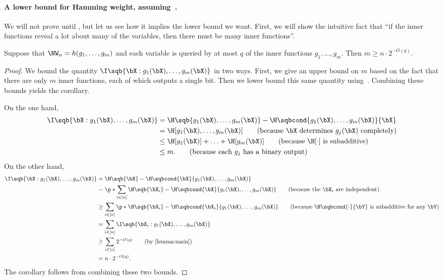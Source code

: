 \paragraph*{A lower bound for Hamming weight, assuming~.}
We will not prove  until , but let us see how it implies the lower bound we want.
First, we will show the intuitive fact that ``if the inner functions reveal a lot about many of the variables, then there must be many inner functions''.
\begin{corollary}
\label{corollary}
Suppose that $\HW_n = h(g_1, \ldots, g_m)$ and each variable is queried by at most $q$ of the inner functions $g_1, \ldots, g_m$.
Then $m \geq n \cdot 2^{-O(q)}$.
\end{corollary}
\begin{proof}
We bound the quantity $\I\sqb{\bX:g_1(\bX), \ldots, g_m(\bX)}$ in two ways.
First, we give an upper bound on $m$ based on the fact that there are only $m$ inner functions, each of which outputs a single bit.
Then we lower bound this same quantity using~.
Combining these bounds yields the corollary.

On the one hand,
\begin{align*}
\I\sqb{\bX:g_1(\bX), \ldots, g_m(\bX)}
&= \H\sqb{g_1(\bX), \ldots, g_m(\bX)} - \H\sqbcond{g_1(\bX), \ldots, g_m(\bX)}{\bX}\\
&= \H[g_1(\bX), \ldots, g_m(\bX)]\tag{because $\bX$ determines $g_j(\bX)$ completely}\\
&\leq \H[g_1(\bX)] + \ldots + \H[g_m(\bX)]\tag{because $\H[\cdot]$ is subadditive}\\
&\leq m.\tag{because each $g_j$ has a binary output}
\end{align*}
On the other hand,
\begin{align*}
\I\sqb{\bX:g_1(\bX), \ldots, g_m(\bX)}
&= \H\sqb{\bX} - \H\sqbcond{\bX}{g_1(\bX), \ldots, g_m(\bX)}\\
&= \p*{\sum_{i\in[n]}\H\sqb{\bX_i}} - \H\sqbcond{\bX}{g_1(\bX), \ldots, g_m(\bX)}\tag{because the $\bX_i$ are independent}\\
&\geq \sum_{i\in[n]}\p*{\H\sqb{\bX_i} - \H\sqbcond{\bX_i}{g_1(\bX), \ldots, g_m(\bX)}}\tag{because $\H\sqbcond{\cdot}{\bY}$ is subadditive for any $\bY$}\\
&= \sum_{i\in[n]}\I\sqb{\bX_i:g_1(\bX), \ldots, g_m(\bX)}\\
&\geq \sum_{i\in[n]}2^{-O(q)}\tag{by \Cref{lemma:main}}\\
&= n \cdot 2^{-O(q)}.
\end{align*}
The corollary follows from combining these two bounds.
\end{proof}

